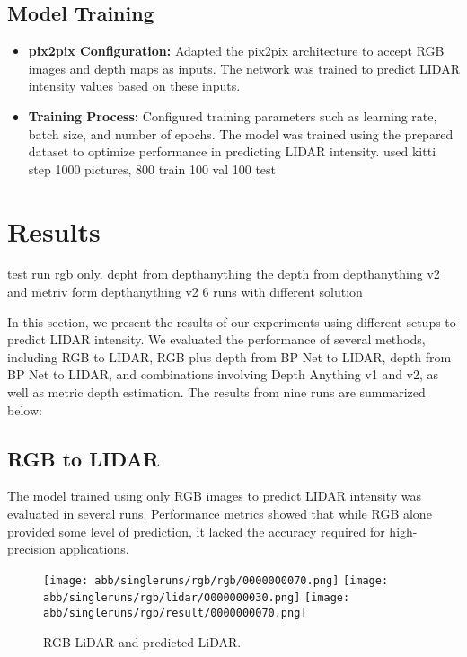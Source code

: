\subsection{Model Training}
\begin{itemize}
	\item \textbf{pix2pix Configuration:} Adapted the pix2pix architecture to accept RGB images and depth maps as inputs. The network was trained to predict LIDAR intensity values based on these inputs.
	\item \textbf{Training Process:} Configured training parameters such as learning rate, batch size, and number of epochs. The model was trained using the prepared dataset to optimize performance in predicting LIDAR intensity.
	used kitti step 1000 pictures, 800 train 100 val 100 test
\end{itemize}
\section{Results}
test run rgb only. depht from depthanything the depth from depthanything v2 and metriv form depthanything v2 6 runs with different solution

In this section, we present the results of our experiments using different setups to predict LIDAR intensity. We evaluated the performance of several methods, including RGB to LIDAR, RGB plus depth from BP Net to LIDAR, depth from BP Net to LIDAR, and combinations involving Depth Anything v1 and v2, as well as metric depth estimation. The results from nine runs are summarized below:

\subsection{RGB to LIDAR}

The model trained using only RGB images to predict LIDAR intensity was evaluated in several runs. Performance metrics showed that while RGB alone provided some level of prediction, it lacked the accuracy required for high-precision applications.
\begin{figure}[!ht]
	\centering
	\texttt{[image: abb/singleruns/rgb/rgb/0000000070.png]}
	\texttt{[image: abb/singleruns/rgb/lidar/0000000030.png]}
	\texttt{[image: abb/singleruns/rgb/result/0000000070.png]}
	\caption{RGB LiDAR and predicted LiDAR.}
	\label{depth}
\end{figure}
